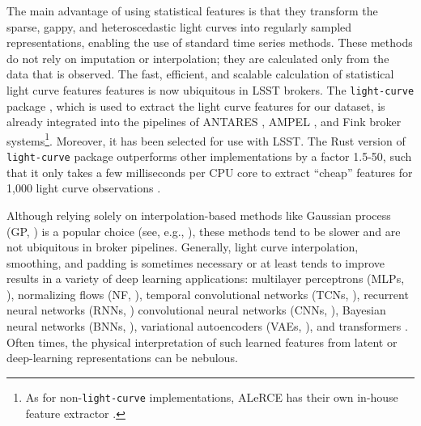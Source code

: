 \documentclass[twocolumn]{aastex63}
\begin{document}
The main advantage of using statistical features is that they transform the sparse, gappy, and heteroscedastic light curves into regularly sampled representations, enabling the use of standard time series methods. These methods do not rely on imputation or interpolation; they are calculated only from the data that is observed. The fast, efficient, and scalable calculation of statistical light curve features features is now ubiquitous in LSST brokers. The \texttt{light-curve} package \citep{Malanchev-LC}, which is used to extract the light curve features for our dataset, is already integrated into the pipelines of ANTARES \citep{Matheson2021}, AMPEL \citep{Nordin2019}, and Fink \citep{Moller2021} broker systems\footnote{As for non-\texttt{light-curve} implementations, ALeRCE has their own in-house feature extractor \citep{Forster2021}.}. Moreover, it has been selected for use with LSST. The Rust version of \texttt{light-curve} package outperforms other implementations by a factor 1.5-50, such that it only takes a few milliseconds per CPU core to extract ``cheap” features for 1,000 light curve observations \citep{lavrukhina2023}. \par

Although relying solely on interpolation-based methods like Gaussian process (GP, \citealt{Rasmussen2005}) is a popular choice (see, e.g., \citealt{Lochner2016, Boone2019, Alves2022}), these methods tend to be slower and are not ubiquitous in broker pipelines. Generally, light curve interpolation, smoothing, and padding is sometimes necessary or at least tends to improve results in a variety of deep learning applications: multilayer perceptrons (MLPs, \citealt{Demianenko2022}), normalizing flows (NF, \citealt{Demianenko2022}), temporal convolutional networks (TCNs, \citealt{Muthukrishna2019}), recurrent neural networks (RNNs, \citealt{Charnock2017, Moller2021, 2022Gagliano_CCA}) convolutional neural networks (CNNs, \citealt{Pasquet2019b, Qu2021, Burhanudin2022}), Bayesian neural networks (BNNs, \citealt{Demianenko2022}), variational autoencoders (VAEs, \citealt{Villar2020, Boone2021, Aleo2023}), and transformers \citep{Donoso-Oliva2023, Moreno-Cartagena2023, Pimentel2023}. Often times, the physical interpretation of such learned features from latent or deep-learning representations can be nebulous. \par
\end{document}
